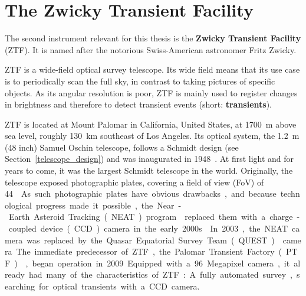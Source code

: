 \chapter{The Zwicky Transient Facility}\label{ztf}
The second instrument relevant for this thesis is the \textbf{Zwicky Transient Facility} (ZTF). It is named after the notorious Swiss-American astronomer Fritz Zwicky.

ZTF is a wide-field optical survey telescope. Its wide field means that its use case is to periodically scan the full sky, in contrast to taking pictures of specific objects. As its angular resolution is poor, ZTF is mainly used to register changes in brightness and therefore to detect transient events (short: \textbf{transients}). 

ZTF is located at Mount Palomar in California, United States, at \SI{1700}{\m} above sea level, roughly \SI{130}{\km} southeast of Los Angeles. Its optical system, the \SI{1.2}{\m} (48 inch) Samuel Oschin telescope, follows a Schmidt design (see Section~\ref{telescope_design}) and was inaugurated in 1948~\cite{Harrington1952}. At first light and for years to come, it was the largest Schmidt telescope in the world. Originally, the telescope exposed photographic plates, covering a field of view (FoV) of \SI{44}{\square\deg}. As such photographic plates have obvious drawbacks, and because technological progress made it possible, the Near-Earth Asteroid Tracking (NEAT) program~ replaced them with a charge-coupled device (CCD) camera in the early 2000s.

In 2003, the NEAT camera was replaced by the Quasar Equatorial Survey Team (QUEST)~ camera. The immediate predecessor of ZTF, the Palomar Transient Factory (PTF)~, began operation in 2009. Equipped with a 96 Megapixel camera, it already had many of the characteristics of ZTF: A fully automated survey, searching for optical transients with a CCD camera.

